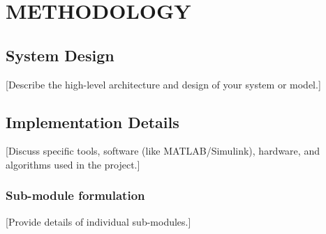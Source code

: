 \chapter{METHODOLOGY}
\label{chap:methodology}

\section{System Design}
[Describe the high-level architecture and design of your system or model.]

\section{Implementation Details}
[Discuss specific tools, software (like MATLAB/Simulink), hardware, and algorithms used in the project.]

\subsection{Sub-module formulation}
[Provide details of individual sub-modules.]
